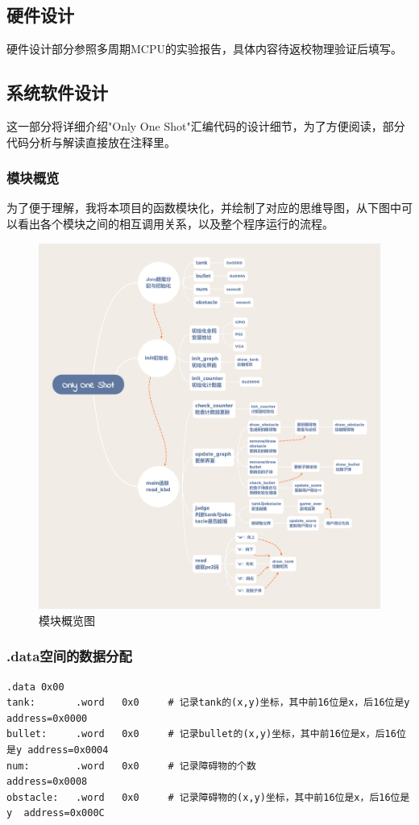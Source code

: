 \subsection{硬件设计}
硬件设计部分参照多周期MCPU的实验报告，具体内容待返校物理验证后填写。

\subsection{系统软件设计}
这一部分将详细介绍"Only One Shot"汇编代码的设计细节，为了方便阅读，部分代码分析与解读直接放在注释里。

\subsubsection{模块概览}
为了便于理解，我将本项目的函数模块化，并绘制了对应的思维导图，从下图中可以看出各个模块之间的相互调用关系，以及整个程序运行的流程。

\begin{figure}[H]
  \centering
  \includegraphics[width=\textwidth]{img/only-one-shot.png}
  \caption{模块概览图
  }\label{fig:modules}
\end{figure}

\subsubsection{.data空间的数据分配}
\begin{lstlisting}[frame=shadowbox] 
.data 0x00
tank:       .word   0x0     # 记录tank的(x,y)坐标，其中前16位是x，后16位是y   address=0x0000
bullet:     .word   0x0     # 记录bullet的(x,y)坐标，其中前16位是x，后16位是y address=0x0004
num:        .word   0x0     # 记录障碍物的个数                               address=0x0008
obstacle:   .word   0x0     # 记录障碍物的(x,y)坐标，其中前16位是x，后16位是y  address=0x000C
\end{lstlisting}

